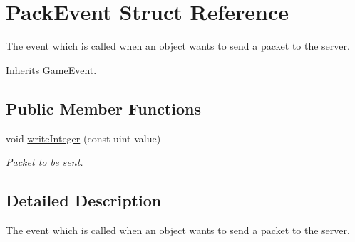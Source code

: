\hypertarget{struct_pack_event}{\section{Pack\-Event Struct Reference}
\label{struct_pack_event}
}


The event which is called when an object wants to send a packet to the server.  




Inherits Game\-Event.

\subsection*{Public Member Functions}
\begin{DoxyCompactItemize}
\item 
\hypertarget{struct_pack_event_aa708f7b43a10da9a9718f0464e320379}{void \hyperlink{struct_pack_event_aa708f7b43a10da9a9718f0464e320379}{write\-Integer} (const uint value)}\label{struct_pack_event_aa708f7b43a10da9a9718f0464e320379}

\begin{DoxyCompactList}\small\item\em Packet to be sent. \end{DoxyCompactList}\end{DoxyCompactItemize}


\subsection{Detailed Description}
The event which is called when an object wants to send a packet to the server. 

